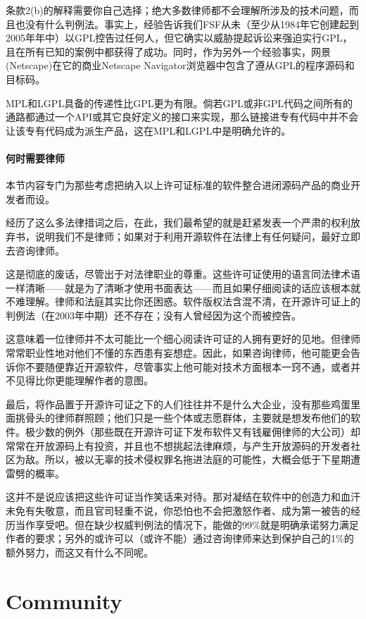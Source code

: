 \documentclass[12pt,oneside]{ctexbook}
\begin{document}
\begin{common-format}
条款2(b)的解释需要你自己选择；绝大多数律师都不会理解所涉及的技术问题，而且也没有什么判例法。事实上，经验告诉我们FSF从未（至少从1984年它创建起到2005年年中）以GPL控告过任何人，但它确实以威胁提起诉讼来强迫实行GPL，且在所有已知的案例中都获得了成功。同时，作为另外一个经验事实，网景(Netscape)在它的商业Netscape Navigator浏览器中包含了遵从GPL的程序源码和目标码。

MPL和LGPL具备的传递性比GPL更为有限。倘若GPL或非GPL代码之间所有的通路都通过一个API或其它良好定义的接口来实现，那么链接进专有代码中并不会让该专有代码成为派生产品，这在MPL和LGPL中是明确允许的。

\subsection{何时需要律师}
本节内容专门为那些考虑把纳入以上许可证标准的软件整合进闭源码产品的商业开发者而设。

经历了这么多法律措词之后，在此，我们最希望的就是赶紧发表一个严肃的权利放弃书，说明我们不是律师；如果对于利用开源软件在法律上有任何疑问，最好立即去咨询律师。

这是彻底的废话，尽管出于对法律职业的尊重。这些许可证使用的语言同法律术语一样清晰——就是为了清晰才使用书面表达——而且如果仔细阅读的话应该根本就不难理解。律师和法庭其实比你还困惑。软件版权法含混不清，在开源许可证上的判例法（在2003年中期）还不存在；没有人曾经因为这个而被控告。

这意味着一位律师并不太可能比一个细心阅读许可证的人拥有更好的见地。但律师常常职业性地对他们不懂的东西患有妄想症。因此，如果咨询律师，他可能更会告诉你不要随便靠近开源软件，尽管事实上他可能对技术方面根本一窍不通，或者并不见得比你更能理解作者的意图。

最后，将作品置于开源许可证之下的人们往往并不是什么大企业，没有那些鸡蛋里面挑骨头的律师群照顾；他们只是一些个体或志愿群体，主要就是想发布他们的软件。极少数的例外（那些既在开源许可证下发布软件又有钱雇佣律师的大公司）却常常在开放源码上有投资，并且也不想挑起法律麻烦，与产生开放源码的开发者社区为敌。所以，被以无辜的技术侵权罪名拖进法庭的可能性，大概会低于下星期遭雷劈的概率。

这并不是说应该把这些许可证当作笑话来对待。那对凝结在软件中的创造力和血汗未免有失敬意，而且官司轻重不说，你恐怕也不会把激怒作者、成为第一被告的经历当作享受吧。但在缺少权威判例法的情况下，能做的99\%{}就是明确承诺努力满足作者的要求；另外的或许可以（或许不能）通过咨询律师来达到保护自己的1\%{}的额外努力，而这又有什么不同呢。


\part{Community}

\end{common-format}
\end{document}
